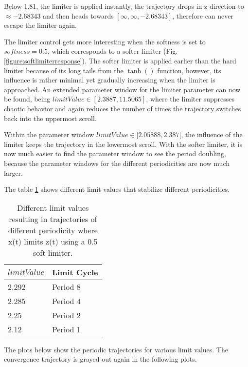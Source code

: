 \documentclass[main]{subfiles}
\begin{document}
Below 1.81, the limiter is applied instantly, the trajectory drops in z direction to \(\approx-2.68343\) and then heads towards \([\infty,\infty,-2.68343]\), therefore can never escape the limiter again.


The limiter control gets more interesting when the softness is set to \(softness=0.5\), which corresponds to a softer limiter (Fig. \ref{figure:softlimiterresponse}). %
%
The softer limiter is applied earlier than the hard limiter because of its long tails from the \(\tanh()\) function, however, its influence is rather minimal yet gradually increasing when the limiter is approached. %
%
An extended parameter window for the limiter parameter can now be found, being \(limitValue \in [2.3887,11.5065]\), where the limiter suppresses chaotic behavior and again reduces the number of times the trajectory switches back into the uppermost scroll.

Within the parameter window \(limitValue \in [2.05888,2.387[\), the influence of the limiter keeps the trajectory in the lowermost scroll. %
%
With the softer limiter, it is now much easier to find the parameter window to see the period doubling, because the parameter windows for the different periodicities are now much larger. 

The table \ref{table:z-0.5-periodicities} shows different limit values that stabilize different periodicities.

\begin{table}[H]
\renewcommand{\arraystretch}{1.2}
\center
\begin{tabular}{@{}ll@{}}
	\toprule
   \(limitValue\) & Limit Cycle\\
   \midrule
   2.292 & Period 8 \\ 
   2.285 & Period 4 \\
   2.25  & Period 2 \\
   2.12 & Period 1 \\
   \bottomrule
\end{tabular}
\caption[Periodicity control limit values (x(t) limiting z(t) with softness 0.5)]{Different limit values resulting in trajectories of different periodicity where x(t) limits z(t) using a 0.5 soft limiter.}
\label{table:z-0.5-periodicities}
\end{table}

The plots below show the periodic trajectories for various limit values. The convergence trajectory is grayed out again in the following plots.
\end{document}
